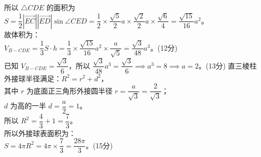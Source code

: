 {  所以 \(\triangle CDE\) 的面积为 \(S = \dfrac{1}{2}|\overrightarrow{EC}||\overrightarrow{ED}|\sin\angle CED = \dfrac{1}{2} \times \dfrac{\sqrt{5}}{2}a \times \dfrac{\sqrt{2}}{2}a \times \dfrac{\sqrt{6}}{4} = \dfrac{\sqrt{15}}{16}a^2\)。\\
  故体积为：\\
  \(V_{B-CDE} = \dfrac{1}{3} S \cdot h = \dfrac{1}{3} \times \dfrac{\sqrt{15}}{16}a^2 \times \dfrac{a}{\sqrt{5}} = \dfrac{\sqrt{3}}{48}a^3\)。\hfill (12分)\\
  已知 \(V_{B-CDE} = \dfrac{\sqrt{3}}{6}\)，所以 \(\dfrac{\sqrt{3}}{48}a^3 = \dfrac{\sqrt{3}}{6} \implies a^3 = 8 \implies a = 2\)。\hfill (13分)%
  直三棱柱外接球半径满足：\(R^2 = r^2 + d^2\)，\\
  其中 \(r\) 为底面正三角形外接圆半径 \(r = \dfrac{a}{\sqrt{3}} = \dfrac{2}{\sqrt{3}}\)；\\
  \(d\) 为高的一半 \(d = \dfrac{a}{2} = 1\)。\\
  所以 \(R^2 = \dfrac{4}{3} + 1 = \dfrac{7}{3}\)。\\
  所以外接球表面积为：\\
  \(S = 4\pi R^2 = 4\pi \times \dfrac{7}{3} = \dfrac{28\pi}{3}\)。\hfill (15分)%
}
\newcommand{\qSeventeenDiagnosis}{\errortag{线面平行条件漏写} 第一问几何法证明中，学生常漏掉关键的线不在面内 \(DE \not\subset \text{平面 } AA_1B_1B\) 这一采分点。第二问体积算错或外接球半径公式记错。}
\newcommand{\qSeventeenTeachingNotes}{强调立体几何中“直棱柱外接球”的统一解法模型：棱柱外接球中心是上下底面外接圆心连线的中点，球半径满足 \(R^2 = r_{\text{底}}^2 + \left(\dfrac{h}{2}\right)^2\)。}

